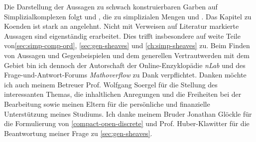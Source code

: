 Die Darstellung der Aussagen zu schwach konstruierbaren Garben auf
Simplizialkomplexen folgt \cite{KS} und \cite{WS}, die zu simplizialen
Mengen \cite{GJ} und \cite{GM}. Das Kapitel zu Koenden ist stark an
\cite{Lore} angelehnt. Nicht mit Verweisen auf Literatur markierte
Aussagen sind eigenständig erarbeitet. Dies trifft insbesondere auf
weite Teile von\autoref{sec:simp-comp-ord}, \autoref{sec:gen-sheaves}
und \autoref{ch:simp-sheaves} zu. Beim Finden von Aussagen und
Gegenbeispielen und dem generellen Vertrautwerden mit dem Gebiet bin
ich dennoch der Autorschaft der Online-Enzyklopädie \emph{nLab} und
des Frage-und-Antwort-Forums \emph{Mathoverflow} zu Dank
verpflichtet. Danken möchte ich auch meinem Betreuer Prof. Wolfgang
Soergel für die Stellung des interessanten Themas, die inhaltlichen
Anregungen und die Freiheiten bei der Bearbeitung sowie meinen Eltern
für die persönliche und finanzielle Unterstützung meines Studiums. Ich
danke meinem Bruder Jonathan Glöckle für die Formulierung von
\ref{compact-open-discrete} und Prof. Huber-Klawitter für die
Beantwortung meiner Frage zu \autoref{sec:gen-sheaves}.
